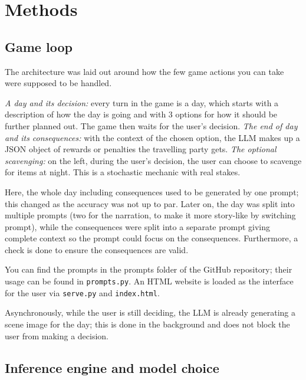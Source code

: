 \documentclass{article}
\begin{document}

\section{Methods}

\subsection{Game loop}

The architecture was laid out around how the few game actions you can take were supposed
to be handled.

\emph{A day and its decision:} every turn in the game is a day, which starts with a
description of how the day is going and with 3 options for how it should be further
planned out. The game then waits for the user's decision.
\emph{The end of day and its consequences:} with the context of the chosen option, the
LLM makes up a JSON object of rewards or penalties the travelling party gets.
\emph{The optional scavenging:} on the left, during the user's decision, the user can
choose to scavenge for items at night. This is a stochastic mechanic with real stakes.

Here, the whole day including consequences used to be generated by one prompt; this
changed as the accuracy was not up to par.
Later on, the day was split into multiple prompts (two for the narration, to make it more
story-like by switching prompt), while the consequences were split into a separate prompt
giving complete context so the prompt could focus on the consequences.
Furthermore, a check is done to ensure the consequences are valid.

You can find the prompts in the prompts folder of the GitHub repository; their usage can
be found in \texttt{prompts.py}.
An HTML website is loaded as the interface for the user via \texttt{serve.py} and
\texttt{index.html}.

Asynchronously, while the user is still deciding, the LLM is already generating a scene
image for the day; this is done in the background and does not block the user from making
a decision.

\subsection{Inference engine and model choice}
\end{document}
